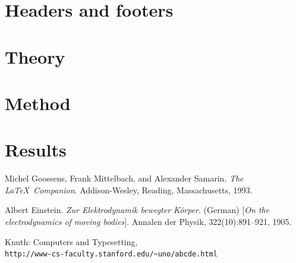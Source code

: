 



%
\section{Headers and footers}
\lipsum[1-2]\cite{latexcompanion}

%
\section{Theory}
\lipsum[1-3]\cite{knuthwebsite}
%
\section{Method}
\lipsum[1-2]
%
\section{Results}


%

\begin{thebibliography}{3}
Michel Goossens, Frank Mittelbach, and Alexander Samarin.
\textit{The \LaTeX\ Companion}.
Addison-Wesley, Reading, Massachusetts, 1993.

Albert Einstein.
\textit{Zur Elektrodynamik bewegter K{\"o}rper}. (German)
[\textit{On the electrodynamics of moving bodies}].
Annalen der Physik, 322(10):891–921, 1905.

Knuth: Computers and Typesetting,
\\\texttt{http://www-cs-faculty.stanford.edu/\~{}uno/abcde.html}
\end{thebibliography}

